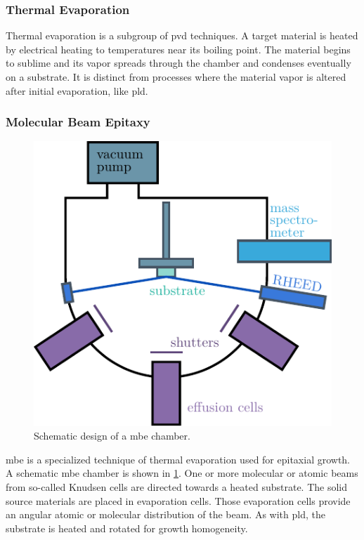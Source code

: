\subsubsection{Thermal Evaporation}
Thermal evaporation is a subgroup of \ac{pvd} techniques. 
A target material is heated by electrical heating to temperatures near its boiling 
point.
The material begins to sublime and its vapor spreads through the chamber and condenses 
eventually on a substrate.
It is distinct from processes where the material vapor is altered after initial 
evaporation, like \ac{pld}. 

\subsubsection{Molecular Beam Epitaxy}
\begin{figure}
	\includegraphics{../assets/mbe.pdf}
	\caption{Schematic design of a \ac{mbe} chamber. }
	\label{fig:mbe}
\end{figure}

\Ac{mbe} is a specialized technique of thermal evaporation used for epitaxial growth.
A schematic \ac{mbe} chamber is shown in \cref{fig:mbe}. 
One or more molecular or atomic beams from so-called Knudsen cells are directed towards 
a heated substrate.
The solid source materials are placed in evaporation cells.
Those evaporation cells provide an angular atomic or molecular distribution of the beam.
As with \ac{pld}, the substrate is heated and rotated for growth homogeneity.

